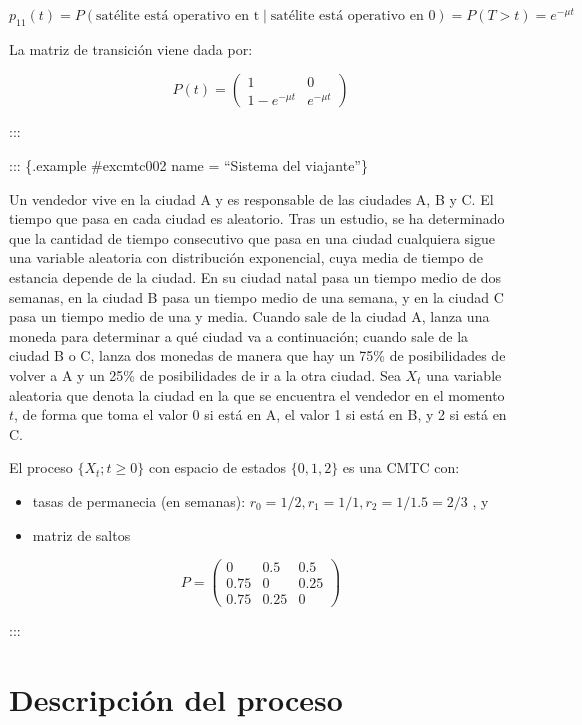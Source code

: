 \documentclass[
]{book}
\providecommand{\tightlist}{%
  \setlength{\itemsep}{0pt}\setlength{\parskip}{0pt}}
\theoremstyle{definition}
\theoremstyle{definition}
\theoremstyle{definition}
\theoremstyle{definition}
\theoremstyle{remark}
\begin{document}
\[p_{11}(t) = P(\text{satélite está operativo en t} \mid \text{satélite está operativo en 0}) = P(T >t) = e^{-\mu t}\]

La matriz de transición viene dada por:

\[P(t) = 
\begin{pmatrix}
1 & 0\\
1- e^{-\mu t} & e^{-\mu t} 
\end{pmatrix}\]

:::

::: \{.example \#excmtc002 name = ``Sistema del viajante''\}

Un vendedor vive en la ciudad A y es responsable de las ciudades A, B y C. El tiempo que pasa en cada ciudad es aleatorio. Tras un estudio, se ha determinado que la cantidad de tiempo consecutivo que pasa en una ciudad cualquiera sigue una variable aleatoria con distribución exponencial, cuya media de tiempo de estancia depende de la ciudad. En su ciudad natal pasa un tiempo medio de dos semanas, en la ciudad B pasa un tiempo medio de una semana, y en la ciudad C pasa un tiempo medio de una y media. Cuando sale de la ciudad A, lanza una moneda para determinar a qué ciudad va a continuación; cuando sale de la ciudad B o C, lanza dos monedas de manera que hay un 75\% de posibilidades de volver a A y un 25\% de posibilidades de ir a la otra ciudad. Sea \(X_t\) una variable aleatoria que denota la ciudad en la que se encuentra el vendedor en el momento \(t\), de forma que toma el valor 0 si está en A, el valor 1 si está en B, y 2 si está en C.

El proceso \(\{X_t; t \geq 0\}\) con espacio de estados \(\{0, 1, 2\}\) es una CMTC con:

\begin{itemize}
\tightlist
\item
  tasas de permanecia (en semanas): \(r_0 = 1/2, r_1 = 1/1, r_2 = 1/1.5 = 2/3\) , y
\item
  matriz de saltos
\end{itemize}

\[P = 
\begin{pmatrix}
0 & 0.5 & 0.5\\
0.75 & 0 & 0.25\\
0.75 & 0.25 & 0
\end{pmatrix}\]

:::

\hypertarget{CMTCB}{%
\section{Descripción del proceso}\label{CMTCB}}
\end{document}
